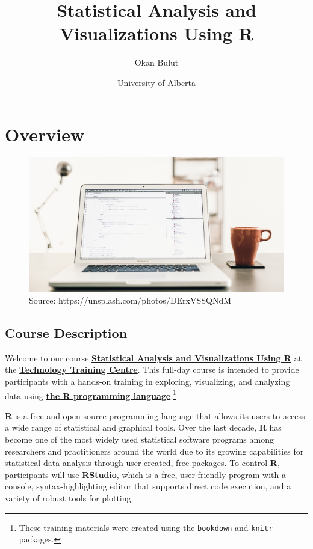 \documentclass[]{book}
\title{Statistical Analysis and Visualizations Using R}
\author{Okan Bulut}
\date{University of Alberta}
\let\rmarkdownfootnote\footnote%
\def\footnote{\protect\rmarkdownfootnote}
\begin{document}
\maketitle

{
\setcounter{tocdepth}{1}
\tableofcontents
}
\hypertarget{overview}{%
\chapter{Overview}\label{overview}}

\begin{figure}

{\centering \includegraphics[width=0.6\linewidth]{figure/artem-sapegin-180146-unsplash_sm} 

}

\caption{Source: https://unsplash.com/photos/DErxVSSQNdM}\label{fig:start}
\end{figure}

\hypertarget{course-description}{%
\section{Course Description}\label{course-description}}

Welcome to our course \href{https://ttc-events.azurewebsites.net/\#!/courseInfo/3522459e3a0746daa29e49f77c27f041}{\textbf{Statistical Analysis and Visualizations Using R}} at the \href{https://www.ualberta.ca/technology-training/}{\textbf{Technology Training Centre}}. This full-day course is intended to provide participants with a hands-on training in exploring, visualizing, and analyzing data using \href{https://www.r-project.org/}{\textbf{the R programming language}}.\footnote{These training materials were created using the \texttt{bookdown} \citep{R-bookdown} and \texttt{knitr} \citep{R-knitr} packages.}

\textbf{R} \citep{R-base} is a free and open-source programming language that allows its users to access a wide range of statistical and graphical tools. Over the last decade, \textbf{R} has become one of the most widely used statistical software programs among researchers and practitioners around the world due to its growing capabilities for statistical data analysis through user-created, free packages. To control \textbf{R}, participants will use \href{https://www.rstudio.com/}{\textbf{RStudio}}, which is a free, user-friendly program with a console, syntax-highlighting editor that supports direct code execution, and a variety of robust tools for plotting.
\end{document}
